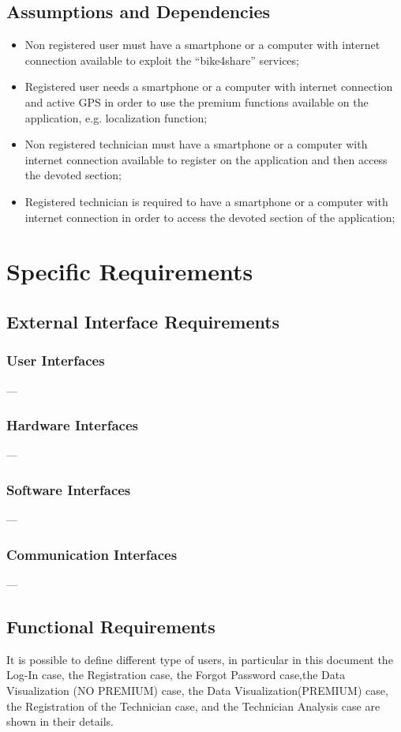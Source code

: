 \documentclass{article}
\begin{document}
\subsection{Assumptions and Dependencies}
\begin{itemize}
    \item Non registered user must have a smartphone or a computer with internet connection available to exploit the “bike4share” services;
    \item Registered user needs a smartphone or a computer with internet connection and active GPS in order to use the premium functions available on the application, e.g. localization function;
    \item Non registered technician must have a smartphone or a computer with internet connection available to register on the application and then access the devoted section;
    \item Registered technician is required to have a smartphone or a computer with internet connection in order to access the devoted section of the application;
\end{itemize}

\section{Specific Requirements} 
\subsection{External Interface Requirements}
\subsubsection{User Interfaces}
---
\subsubsection{Hardware Interfaces}
---
\subsubsection{Software Interfaces}
---
\subsubsection{Communication Interfaces}
---

\subsection{Functional Requirements}
It is possible to define different type of users, in particular in this document the Log-In case, the Registration case, the Forgot Password case,the Data Visualization (NO PREMIUM) case, the Data Visualization(PREMIUM) case, the Registration of the Technician case, and the Technician Analysis case are shown in their details.
\end{document}
